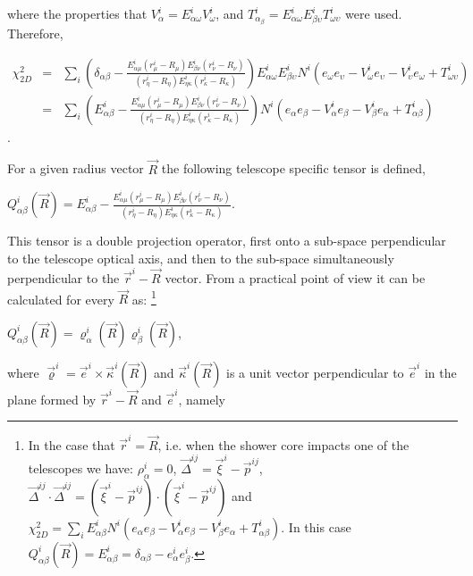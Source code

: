 \documentclass[letterpaper]{article}
\begin{document}
where the properties that 
$V_{\alpha}^{i}=E_{\alpha\omega}^{i}V_{\omega}^{i}$, and 
$T_{\alpha_{\beta}}^{i}=E_{\alpha\omega}^{i}E_{\beta\upsilon}^{i}
T_{\omega\upsilon}^{i}$ were used. Therefore,

$\displaystyle \begin{array}{lll}
\chi_{2D}^{2} & = & \sum\limits_{i}
\left(\delta_{\alpha\beta}-\frac{E_{\alpha\mu}^{i}(r_{\mu}^{i}
-R_{\mu})E_{\beta\nu}^{i}(r_{\nu}^{i}-R_{\nu})}
{(r_{\eta}^{i}-R_{\eta})E_{\eta\kappa}^{i}(r_{\kappa}^{i}-R_{\kappa})}
\right)E_{\alpha\omega}^{i}E_{\beta\upsilon}^{i}N^{i}
\left(e_{\omega}e_{\upsilon}-V_{\omega}^{i}e_{\upsilon}
-V_{\upsilon}^{i}e_{\omega}+T_{\omega\upsilon}^{i}\right) \\
& = & \sum\limits_{i}\left(E_{\alpha\beta}^{i}-
\frac{E_{\alpha\mu}^{i}(r_{\mu}^{i}-R_{\mu})
E_{\beta\nu}^{i}(r_{\nu}^{i}-R_{\nu})}
{(r_{\eta}^{i}-R_{\eta})E_{\eta\kappa}^{i}(r_{\kappa}^{i}-R_{\kappa})}
\right)N^{i}\left(e_{\alpha}e_{\beta}-V_{\alpha}^{i}e_{\beta}-
V_{\beta}^{i}e_{\alpha}+T_{\alpha\beta}^{i}\right)
\end{array}$.

For a given radius vector $\vec{R}$ the following telescope specific
tensor is defined,

$\displaystyle Q_{\alpha\beta}^{i}(\vec{R})=E_{\alpha\beta}^{i}
-\frac{E_{\alpha\mu}^{i}(r_{\mu}^{i}
-R_{\mu})E_{\beta\nu}^{i}(r_{\nu}^{i}-R_{\nu})}
{(r_{\eta}^{i}-R_{\eta})E_{\eta\kappa}^{i}(r_{\kappa}^{i}-R_{\kappa})}$.

This tensor is a double projection operator, first onto a sub-space
perpendicular to the telescope optical axis, and then to the sub-space
simultaneously perpendicular to the $\vec{r}^{i}-\vec{R}$ vector. From
a practical point of view it can be calculated for every $\vec{R}$ as:
\footnote{In the case that $\vec{r}^i=\vec{R}$, i.e. when the shower
core impacts one of the telescopes we have: $\rho_{\alpha}^{i}=0$,
$\vec{\Delta}^{ij}=\vec{\xi}^{i}-\vec{p}^{ij}$,
$\vec{\Delta}^{ij}\cdot\vec{\Delta}^{ij}
=(\vec{\xi}^{i}-\vec{p}^{ij})\cdot(\vec{\xi}^{i}-\vec{p}^{ij})$ and
$\chi_{2D}^{2}=\sum\limits_{i}E_{\alpha\beta}^{i}
N^{i}\left(e_{\alpha}e_{\beta}-V_{\alpha}^{i}e_{\beta}-
V_{\beta}^{i}e_{\alpha}+T_{\alpha\beta}^{i}\right)$. In this case
$Q_{\alpha\beta}^{i}(\vec{R})=E_{\alpha\beta}^{i}=\delta_{\alpha \beta
}-e_{\alpha }^{i}e_{\beta }^{i}$.}

$\displaystyle Q_{\alpha\beta}^{i}(\vec{R})
=\varrho_{\alpha}^{i}(\vec{R})\varrho_{\beta}^{i}(\vec{R})$,

where $\vec{\varrho}^{i}=\vec{e}^{i}\times\vec{\kappa}^{i}(\vec{R})$
and $\vec{\kappa}^{i}(\vec{R})$ is a unit vector perpendicular to
$\vec{e}^{i}$ in the plane formed by $\vec{r}^{i}-\vec{R}$ and
$\vec{e}^{i}$, namely
\end{document}
